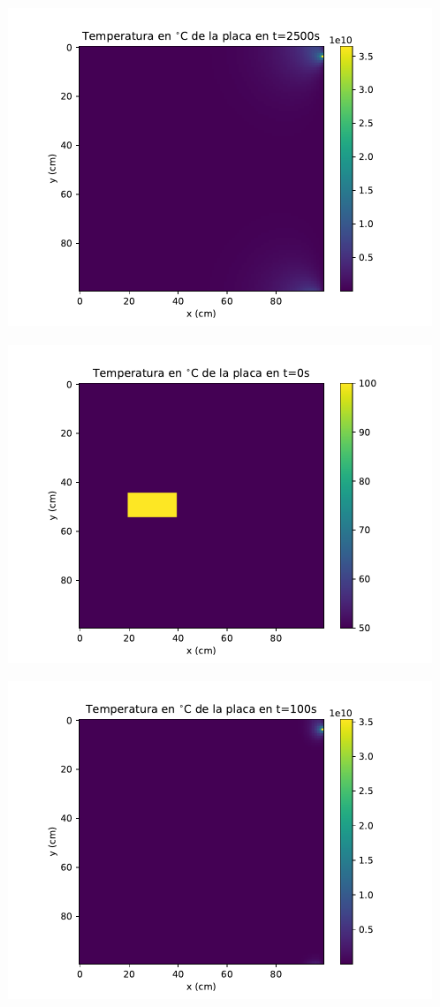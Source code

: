 \documentclass[12pt,letterpaper]{article}
\begin{document}
\begin{figure}[h]
\includegraphics{a1_2500.pdf}
\centering
\end{figure}

\begin{figure}[h]
\includegraphics{a2_0.pdf}
\centering
\end{figure}

\begin{figure}[h]
\includegraphics{a2_100.pdf}
\centering
\end{figure}
\end{document}
